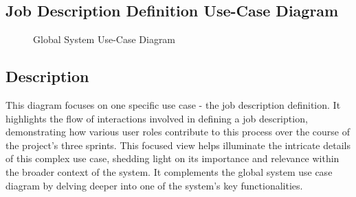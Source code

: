 \subsection{Job Description Definition Use-Case Diagram}
\begin{figure}[H]
    \centering
    \caption{ Global System Use-Case Diagram }
    \label{fig:Job_Description_Definition_UseCase_Diagram}
\end{figure}

\subsection*{Description}
This diagram focuses on one specific use case - the job description definition. It highlights the flow of interactions involved in defining a job description, demonstrating how various user roles contribute to this process over the course of the project's three sprints. This focused view helps illuminate the intricate details of this complex use case, shedding light on its importance and relevance within the broader context of the system. It complements the global system use case diagram by delving deeper into one of the system's key functionalities.

